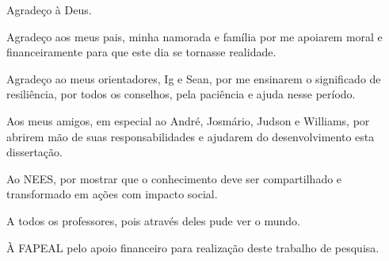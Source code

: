 \begin{agradecimentos}

Agradeço à Deus.

Agradeço aos meus pais, minha namorada e família por me apoiarem moral e financeiramente para que este dia se tornasse realidade.

Agradeço ao meus orientadores, Ig e Sean, por me ensinarem o significado de resiliência, por todos os conselhos, pela paciência e ajuda nesse período.

Aos meus amigos, em especial ao André, Josmário, Judson e Williams, por abrirem mão de suas responsabilidades e ajudarem do desenvolvimento esta dissertação.

Ao NEES, por mostrar que o conhecimento deve ser compartilhado e transformado em ações com impacto social. 

A todos os professores, pois através deles pude ver o mundo.

À FAPEAL pelo apoio financeiro para realização deste trabalho de pesquisa.

\end{agradecimentos}
